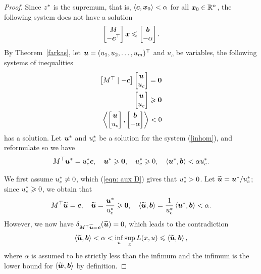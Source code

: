 \begin{proof}
\noindent Since $z^\ast$ is the supremum, that is, $\left\langle{\boldsymbol c}, {\boldsymbol x}_0\right\rangle < \alpha$ for all ${\boldsymbol x}_0\in\mathbb R^n$, the following system does not have a solution
$$ \begin{bmatrix} M\\ -{\boldsymbol c}^\top \end{bmatrix} {\boldsymbol x} \leqslant \begin{bmatrix} \boldsymbol b\\ -\alpha\end{bmatrix}. $$
By Theorem~\ref{farkas}, let ${\boldsymbol u} = (u_1, u_2, \dots, u_m)^\top$ and $u_c$ be variables, the following systems of inequalities  
\begin{equation}\label{inhom} \begin{split}
\begin{bmatrix} M^\top\mid -{\boldsymbol c} \end{bmatrix}\begin{bmatrix} {\boldsymbol u}\\ u_c \end{bmatrix} = \boldsymbol0 \\
\begin{bmatrix} {\boldsymbol u}\\ u_c \end{bmatrix}\geqslant\boldsymbol0 \\
\left\langle\begin{bmatrix} {\boldsymbol u}\\ u_c \end{bmatrix}, \begin{bmatrix} {\boldsymbol b}\\ -\alpha \end{bmatrix}\right\rangle < 0 
\end{split}\end{equation}
has a solution. Let ${\boldsymbol u}^\ast$ and $u_c^\ast$ be a solution for the system (\ref{inhom}), and reformulate so we have 
\begin{equation}\label{eqn: aux D}  M^\top {\boldsymbol u}^\ast =  u_c^\ast{\boldsymbol c}, \quad {\boldsymbol u}^\ast \geqslant\boldsymbol0,\quad u_c^\ast \geqslant0,\quad \left\langle{\boldsymbol u}^\ast, {\boldsymbol b}\right\rangle < \alpha  u_c^\ast. \end{equation}

We first assume $u_c^\ast\neq 0$, which (\ref{eqn: aux D}) gives that $u_c^\ast > 0$. Let $\widetilde{{\boldsymbol u}} = {\boldsymbol u}^\ast / u_c^\ast$; since $u_c^\ast\geqslant 0$, we obtain that 
$$  M^\top \widetilde{{\boldsymbol u}} =  {\boldsymbol c}, \quad 
\widetilde{{\boldsymbol u}} = \frac{{\boldsymbol u}^\ast}{u_c^\ast} \geqslant \boldsymbol0,\quad 
\left\langle\widetilde{{\boldsymbol u}}, {\boldsymbol b}\right\rangle = \frac{1}{u_c^\ast}\left\langle{\boldsymbol u}^\ast, {\boldsymbol b}\right\rangle < \alpha . $$  
However, we now have $\delta_{M^\top\widetilde{{\boldsymbol u}} = {\boldsymbol c}} (\widetilde{{\boldsymbol u}}) = 0$, which leads to the contradiction
\[ \left\langle\widetilde{{\boldsymbol u}}, {\boldsymbol b}\right\rangle  < \alpha< \inf_{u} \sup_{x} L( x, u) \leqslant \left\langle\widetilde{{\boldsymbol u}}, {\boldsymbol b}\right\rangle, \] where $\alpha$ is assumed to be strictly less than the infimum and the infimum is the lower bound for $\left\langle\widetilde{{\boldsymbol w}}, {\boldsymbol b}\right\rangle$ by definition.  


\end{proof}
